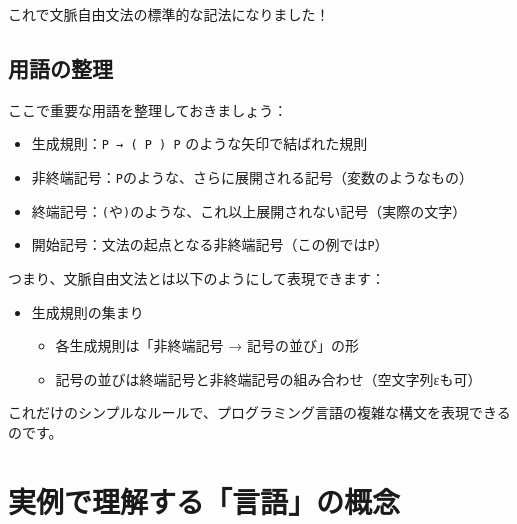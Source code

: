 \begin{Shaded}
\begin{Highlighting}[]
\end{Highlighting}
\end{Shaded}

これで文脈自由文法の標準的な記法になりました！

\hypertarget{chapter4-ux7528ux8a9eux306eux6574ux7406}{%
\subsection{用語の整理}\label{chapter4-ux7528ux8a9eux306eux6574ux7406}}

ここで重要な用語を整理しておきましょう：

\begin{itemize}
\tightlist
\item
  生成規則：\texttt{P\ →\ (\ P\ )\ P} のような矢印で結ばれた規則
\item
  非終端記号：\texttt{P}のような、さらに展開される記号（変数のようなもの）
\item
  終端記号：\texttt{(}や\texttt{)}のような、これ以上展開されない記号（実際の文字）
\item
  開始記号：文法の起点となる非終端記号（この例では\texttt{P}）
\end{itemize}

つまり、文脈自由文法とは以下のようにして表現できます：

\begin{itemize}
\tightlist
\item
  生成規則の集まり

  \begin{itemize}
  \tightlist
  \item
    各生成規則は「非終端記号 → 記号の並び」の形
  \item
    記号の並びは終端記号と非終端記号の組み合わせ（空文字列εも可）
  \end{itemize}
\end{itemize}

これだけのシンプルなルールで、プログラミング言語の複雑な構文を表現できるのです。

\hypertarget{chapter4-ux5b9fux4f8bux3067ux7406ux89e3ux3059ux308bux8a00ux8a9eux306eux6982ux5ff5}{%
\section{実例で理解する「言語」の概念}\label{chapter4-ux5b9fux4f8bux3067ux7406ux89e3ux3059ux308bux8a00ux8a9eux306eux6982ux5ff5}}

